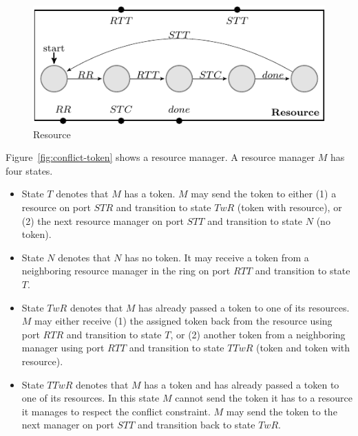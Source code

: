 \begin{figure}[H]
\begin{center}
\includegraphics[scale=1.2]{compiledfigures/resource-crop.pdf}
\caption{Resource}
\label{fig:resource}
\end{center}
\end{figure}

Figure~\ref{fig:conflict-token} shows a resource manager.
A resource manager $M$ has four states. 
\begin{itemize}
  \item State $T$ denotes that $M$ has a token. $M$ may send the token to either 
    (1) a resource on port $STR$ and transition to state $TwR$ (token with resource), or 
    (2) the next resource manager on port $STT$ and transition to state $N$ (no token).
  \item State $N$ denotes that $N$ has no token. 
    It may receive a token from a neighboring resource manager in the ring on port $RTT$ 
    and transition to state $T$. 
  \item State $TwR$ denotes that $M$ has already passed a token to one of its resources. 
    $M$ may either receive (1) the assigned token back from the resource using port $RTR$ and transition to state $T$, 
    or (2) another token from a neighboring manager using port $RTT$ and transition to state $TTwR$ (token and token with resource).
  \item State $TTwR$ denotes that $M$ has a token and has already passed a token to one of its resources. 
    In this state $M$ cannot send the token it has to a resource it manages to respect the conflict constraint. 
    $M$ may send the token to the next manager on port $STT$ and transition back to state $TwR$. 
\end{itemize}

